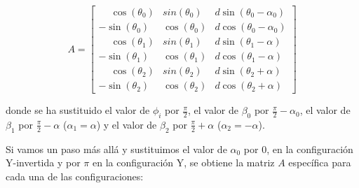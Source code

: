 \documentclass[11pt,a4paper]{article}
\begin{document}
\begin{equation}
    A = \begin{bmatrix}
        \phantom{-}\cos\left(\theta_0\right) & sin\left(\theta_0\right)  & d\sin\left(\theta_0 - \alpha_0\right) \\
        -\sin\left(\theta_0\right)           & \cos\left(\theta_0\right) & d\cos\left(\theta_0 - \alpha_0\right) \\
        \phantom{-}\cos\left(\theta_1\right) & sin\left(\theta_1\right)  & d\sin\left(\theta_1 - \alpha\right)   \\
        -\sin\left(\theta_1\right)           & \cos\left(\theta_1\right) & d\cos\left(\theta_1 - \alpha\right)   \\
        \phantom{-}\cos\left(\theta_2\right) & sin\left(\theta_2\right)  & d\sin\left(\theta_2 + \alpha\right)   \\
        -\sin\left(\theta_2\right)           & \cos\left(\theta_2\right) & d\cos\left(\theta_2 + \alpha\right)
    \end{bmatrix}
    \label{eq:matrix-A-general-3-swerve-drive}
\end{equation}

donde se ha sustituido el valor de \(\phi_i\) por \(\frac{\pi}{2}\), el valor de \(\beta_0\) por \(\frac{\pi}{2} - \alpha_0\), el valor de \(\beta_1\) por \(\frac{\pi}{2} - \alpha\) (\(\alpha_1 = \alpha\)) y el valor de \(\beta_2\) por \(\frac{\pi}{2} + \alpha\) (\(\alpha_2 = -\alpha\)).

Si vamos un paso más allá y sustituimos el valor de \(\alpha_0\) por \(0\), en la configuración Y-invertida y por \(\pi\) en la configuración Y, se obtiene la matriz \(A\) específica para cada una de las configuraciones:
\end{document}
